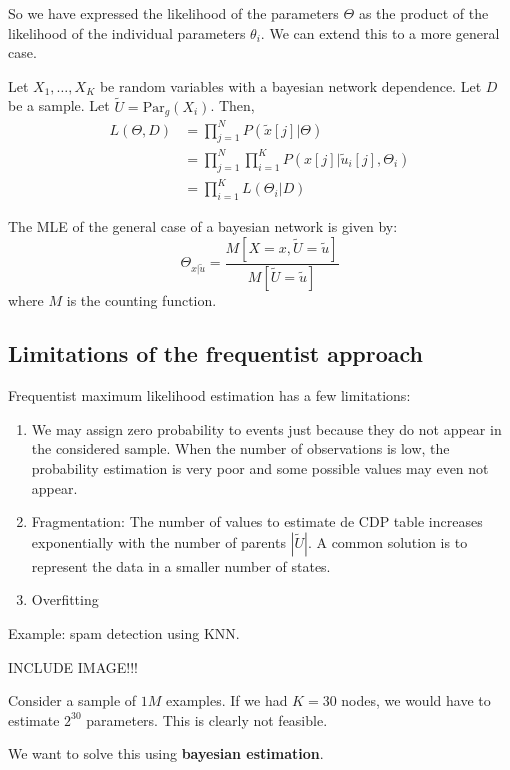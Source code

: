 So we have expressed the likelihood of the parameters \(\Theta\) as the
product of the likelihood of the individual parameters \(\theta_i\). We
can extend this to a more general case.

\begin{nprop}Let \(X_1, \dots, X_K\) be random variables with
  a bayesian network dependence. Let \(D\) be a sample. Let
  \(\tilde U = \text{Par}_g(X_i)\). Then, \begin{align*}
    L(\Theta,D) & = \prod_{j=1}^N P(\tilde x[j]|\Theta)                           \\
                & = \prod_{j=1}^N \prod_{i=1}^{K} P(x[j]| \tilde u_i[j],\Theta_i) \\
                & = \prod_{i=1}^{K} L(\Theta_i| D)
  \end{align*}
\end{nprop}

\begin{nprop} The MLE of the general case of a bayesian network
  is given by: \[
    \Theta_{x|\tilde u} = \frac{M[X = x, \tilde U = \tilde u]}{M[\tilde U = \tilde u]}
  \] where \(M\) is the counting function.
\end{nprop}

\subsection{Limitations of the frequentist approach }

Frequentist maximum likelihood estimation has a few limitations:

\begin{enumerate}
  \item We may assign zero probability to events just because they do not appear in the considered sample. When the number of observations is low, the probability estimation is very poor and some possible values may even not appear.
  \item Fragmentation: The number of values to estimate de CDP table increases exponentially with the number of parents \(|\tilde U|\). A common solution is to represent the data in a smaller number of states.
  \item Overfitting
\end{enumerate}


Example: spam detection using KNN.

INCLUDE IMAGE!!!

Consider a sample of \(1M\) examples. If we had \(K = 30\) nodes, we would have to estimate \(2^{30}\) parameters. This is clearly not feasible.



We want to solve this using \textbf{bayesian estimation}.
